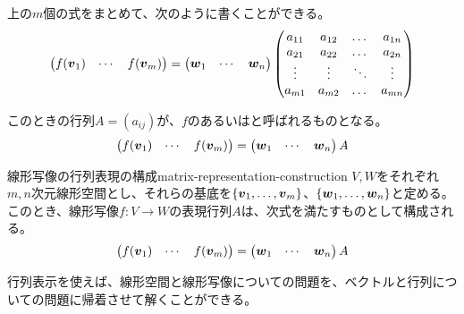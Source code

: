 \documentclass[../../../topic_linear-algebra]{subfiles}
\begin{document}
上の$m$個の式をまとめて、次のように書くことができる。
\begin{equation*}
  \begin{pmatrix}
    f(\vb*{v}_1) & \cdots & f(\vb*{v}_m)
  \end{pmatrix} 
  = \begin{pmatrix}
    \vb*{w}_1 & \cdots & \vb*{w}_n
  \end{pmatrix} \begin{pmatrix} 
  a_{11} & a_{12} & \dots  & a_{1n} \\
  a_{21} & a_{22} & \dots  & a_{2n} \\
  \vdots & \vdots & \ddots & \vdots \\
  a_{m1} & a_{m2} & \dots  & a_{mn}
\end{pmatrix} 
\end{equation*}

\br

このときの行列$A = (a_{ij})$が、$f$のあるいはと呼ばれるものとなる。
\begin{equation*}
  \begin{pmatrix}
    f(\vb*{v}_1) & \cdots & f(\vb*{v}_m)
  \end{pmatrix} = \begin{pmatrix}
    \vb*{w}_1 & \cdots & \vb*{w}_n
  \end{pmatrix} A
\end{equation*}

\br

\begin{theorem}{線形写像の行列表現の構成}{matrix-representation-construction}
  $V, W$をそれぞれ$m,n$次元線形空間とし、それらの基底を$\{ \vb*{v}_1, \ldots, \vb*{v}_m \}$、$\{ \vb*{w}_1, \ldots, \vb*{w}_n \}$と定める。
  このとき、線形写像$f\colon V \to W$の表現行列$A$は、次式を満たすものとして構成される。
  \begin{equation*}
    \begin{pmatrix}
      f(\vb*{v}_1) & \cdots & f(\vb*{v}_m)
    \end{pmatrix} = \begin{pmatrix}
      \vb*{w}_1 & \cdots & \vb*{w}_n
    \end{pmatrix} A
  \end{equation*}
\end{theorem}

\br

行列表示を使えば、線形空間と線形写像についての問題を、ベクトルと行列についての問題に帰着させて解くことができる。
\end{document}

